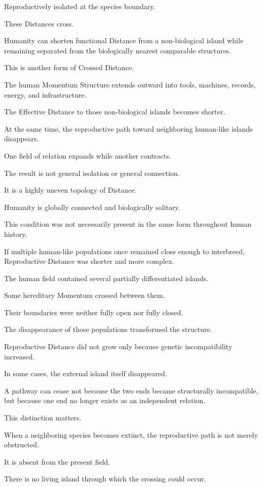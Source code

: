 Reproductively isolated at the species boundary.

These Distances cross.

Humanity can shorten functional Distance from a non-biological island while remaining separated from the biologically nearest comparable structures.

This is another form of Crossed Distance.

The human Momentum Structure extends outward into tools, machines, records, energy, and infrastructure.

The Effective Distance to those non-biological islands becomes shorter.

At the same time, the reproductive path toward neighboring human-like islands disappears.

One field of relation expands while another contracts.

The result is not general isolation or general connection.

It is a highly uneven topology of Distance.

Humanity is globally connected and biologically solitary.

This condition was not necessarily present in the same form throughout human history.

If multiple human-like populations once remained close enough to interbreed, Reproductive Distance was shorter and more complex.

The human field contained several partially differentiated islands.

Some hereditary Momentum crossed between them.

Their boundaries were neither fully open nor fully closed.

The disappearance of those populations transformed the structure.

Reproductive Distance did not grow only because genetic incompatibility increased.

In some cases, the external island itself disappeared.

A pathway can cease not because the two ends became structurally incompatible, but because one end no longer exists as an independent relation.

This distinction matters.

When a neighboring species becomes extinct, the reproductive path is not merely obstructed.

It is absent from the present field.

There is no living island through which the crossing could occur.

